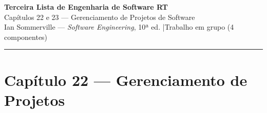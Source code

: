 \documentclass[12pt,a4paper]{article}
\begin{document}
\begin{center}
  {\Large\bfseries Terceira Lista de Engenharia de Software RT}\\[5pt]
  {\large Capítulos 22 e 23 — Gerenciamento de Projetos de Software}\\[4pt]
  {\normalsize Ian Sommerville — \textit{Software Engineering}, 10ª ed.
   \quad|\quad Trabalho em grupo (4 componentes)}
\end{center}
\hrule\vspace{6pt}

\section*{Capítulo 22 — Gerenciamento de Projetos}

\end{document}
